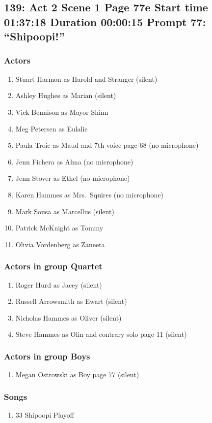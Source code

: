 \subsection{139: Act 2 Scene 1 Page 77e Start time 01:37:18 Duration 00:00:15 Prompt 77: ``Shipoopi!''}

\subsubsection{Actors}
\begin{enumerate}
\item Stuart Harmon as Harold and Stranger (silent)
\item Ashley Hughes as Marian (silent)
\item Vick Bennison as Mayor Shinn
\item Meg Petersen as Eulalie
\item Paula Troie as Maud and 7th voice page 68 (no microphone)
\item Jenn Fichera as Alma (no microphone)
\item Jenn Stover as Ethel (no microphone)
\item Karen Hammes as Mrs.~Squires (no microphone)
\item Mark Sousa as Marcellus (silent)
\item Patrick McKnight as Tommy
\item Olivia Vordenberg as Zaneeta
\end{enumerate}
\subsubsection{Actors in group Quartet}
\begin{enumerate}
\item Roger Hurd as Jacey (silent)
\item Russell Arrowsmith as Ewart (silent)
\item Nicholas Hammes as Oliver (silent)
\item Steve Hammes as Olin and contrary solo page 11 (silent)
\end{enumerate}
\subsubsection{Actors in group Boys}
\begin{enumerate}
\item Megan Ostrowski as Boy page 77 (silent)
\end{enumerate}

\subsubsection{Songs}
\begin{enumerate}
\item 33 Shipoopi Playoff
\end{enumerate}
